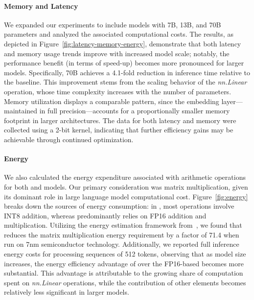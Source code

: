 \paragraph{Memory and Latency}

We expanded our experiments to include models with 7B, 13B, and 70B parameters and analyzed the associated computational costs. The results, as depicted in Figure~\ref{fig:latency-memory-energy}, demonstrate that both latency and memory usage trends improve with increased model scale; notably, the performance benefit (in terms of speed-up) becomes more pronounced for larger models. Specifically,  70B achieves a 4.1-fold reduction in inference time relative to the  baseline. This improvement stems from the scaling behavior of the \emph{nn.Linear} operation, whose time complexity increases with the number of parameters. Memory utilization displays a comparable pattern, since the embedding layer—maintained in full precision—accounts for a proportionally smaller memory footprint in larger architectures. The data for both latency and memory were collected using a 2-bit kernel, indicating that further efficiency gains may be achievable through continued optimization.

\paragraph{Energy}

We also calculated the energy expenditure associated with arithmetic operations for both  and  models. Our primary consideration was matrix multiplication, given its dominant role in large language model computational cost. Figure~\ref{fig:energy} breaks down the sources of energy consumption: in , most operations involve INT8 addition, whereas  predominantly relies on FP16 addition and multiplication. Utilizing the energy estimation framework from~\cite{energycost, pokebnn}, we found that  reduces the matrix multiplication energy requirement by a factor of 71.4 when run on 7nm semiconductor technology. Additionally, we reported full inference energy costs for processing sequences of 512 tokens, observing that as model size increases, the energy efficiency advantage of  over the FP16-based  becomes more substantial. This advantage is attributable to the growing share of computation spent on \emph{nn.Linear} operations, while the contribution of other elements becomes relatively less significant in larger models.

